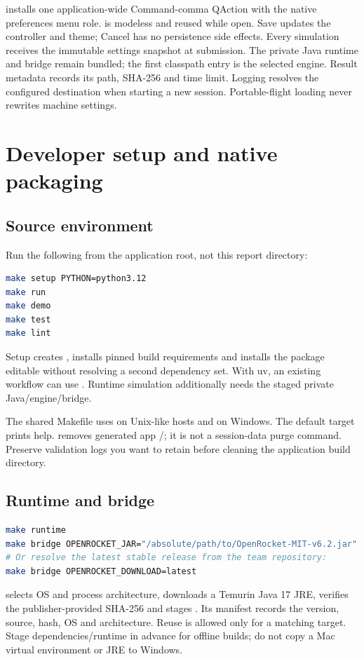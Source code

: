 installs one application-wide Command-comma QAction with the
native preferences menu role.  is modeless and reused while
open. Save updates the controller and theme; Cancel has no persistence side
effects. Every simulation receives the immutable settings snapshot at submission.
The private Java runtime and bridge remain bundled; the first classpath entry
is the selected engine. Result metadata records its path, SHA-256 and time limit.
Logging resolves the configured destination when starting a new session.
Portable-flight loading never rewrites machine settings.

\section{Developer setup and native packaging}\label{sec:build}
\subsection{Source environment}
Run the following from the application root, not this report directory:
\begin{lstlisting}[language=bash]
make setup PYTHON=python3.12
make run
make demo
make test
make lint
\end{lstlisting}
Setup creates , installs pinned build requirements and installs the
package editable without resolving a second dependency set. With uv, an existing
workflow can use . Runtime simulation additionally needs
the staged private Java/engine/bridge.

The shared Makefile uses  on Unix-like hosts and
 on Windows. The default target prints help.
 removes generated app /; it is not
a session-data purge command. Preserve validation logs you want to retain before
cleaning the application build directory.

\subsection{Runtime and bridge}
\begin{lstlisting}[language=bash]
make runtime
make bridge OPENROCKET_JAR="/absolute/path/to/OpenRocket-MIT-v6.2.jar"
# Or resolve the latest stable release from the team repository:
make bridge OPENROCKET_DOWNLOAD=latest
\end{lstlisting}
 selects OS and process architecture, downloads a Temurin Java 17
JRE, verifies the publisher-provided SHA-256 and stages .
Its manifest records the version, source, hash, OS and architecture. Reuse is
allowed only for a matching target. Stage dependencies/runtime in advance for
offline builds; do not copy a Mac virtual environment or JRE to Windows.

